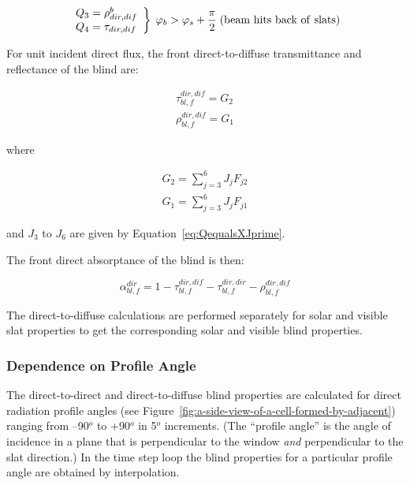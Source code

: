 \begin{equation}
\left.
    \begin{array}{l}
      Q_3 = \rho_{dir,dif}^b \\
      Q_4 = \tau_{dir,dif}
    \end{array}
  \right\}
  \;
  \varphi_b > \varphi_s + \frac{\pi }{2}
  \;
  \rm{ (beam~hits~back~of~slats)}
\end{equation}

For unit incident direct flux, the front direct-to-diffuse transmittance and reflectance of the blind are:

\begin{equation}
  \begin{array}{l}
    \tau_{bl,f}^{dir,dif} = {G_2} \\
    \rho_{bl,f}^{dir,dif} = {G_1}
  \end{array}
\end{equation}

where

\begin{equation}
  \begin{array}{l}
    G_2 = \sum_{j = 3}^6 J_j F_{j2} \\
    G_1 = \sum_{j = 3}^6 J_j F_{j1} 
  \end{array}
\end{equation}

and \({J_3}\) to \({J_6}\) are given by Equation~\ref{eq:QequalsXJprime}.

The front direct absorptance of the blind is then:

\begin{equation}
\alpha_{bl,f}^{dir} = 1 - \tau_{bl,f}^{dir,dif} - \tau_{bl,f}^{dir,dir} - \rho_{bl,f}^{dir,dif}
\end{equation}

The direct-to-diffuse calculations are performed separately for solar and visible slat properties to get the corresponding solar and visible blind properties.

\subsubsection{Dependence on Profile Angle}\label{dependence-on-profile-angle}

The direct-to-direct and direct-to-diffuse blind properties are calculated for direct radiation profile angles (see Figure~\ref{fig:a-side-view-of-a-cell-formed-by-adjacent}) ranging from --90\(^{o}\) to +90\(^{o}\) in 5\(^{o}\) increments. (The ``profile angle'' is the angle of incidence in a plane that is perpendicular to the window \emph{and} perpendicular to the slat direction.) In the time step loop the blind properties for a particular profile angle are obtained by interpolation.

